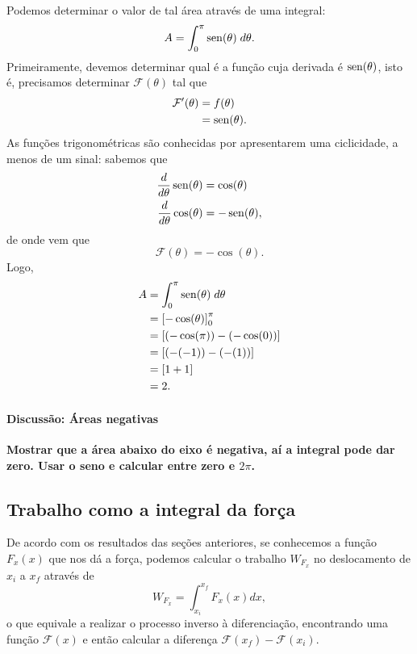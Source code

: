 Podemos determinar o valor de tal área através de uma integral:
\begin{equation}
    A = \int_0^{\pi} \operatorname{sen}(\theta) \; d\theta.
\end{equation}
%
Primeiramente, devemos determinar qual é a função cuja derivada é $\operatorname{sen}(\theta)$, isto é, precisamos determinar $\mathcal{F}(\theta)$ tal que
\begin{align}
    \mathcal{F}'(\theta) &= f(\theta) \\ 
    &= \operatorname{sen}(\theta).
\end{align}
%
As funções trigonométricas são conhecidas por apresentarem uma ciclicidade, a menos de um sinal: sabemos que
\begin{align}
    \frac{d}{d\theta} \operatorname{sen}(\theta) &= \cos(\theta) \\
    \frac{d}{d\theta} \cos(\theta) &= -\operatorname{sen}(\theta),
\end{align}
%
de onde vem que
\begin{equation}
    \mathcal{F}(\theta) = -\cos(\theta).
\end{equation}
%
Logo,
\begin{align}
    A &= \int_0^{\pi} \operatorname{sen}(\theta) \; d\theta \\
    &= \left[-\cos(\theta)\right]_{0}^{\pi} \\
    &= \left[(-\cos(\pi)) - (-\cos(0))\right] \\
    &= [(-(-1)) - (-(1))] \\
    &= [1 + 1] \\
    &= 2.
\end{align}

\paragraph{Discussão: Áreas negativas}

\textbf{Mostrar que a área abaixo do eixo é negativa, aí a integral pode dar zero. Usar o seno e calcular entre zero e $2\pi$.}

\subsection{Trabalho como a integral da força}

De acordo com os resultados das seções anteriores, se conhecemos a função $F_x(x)$ que nos dá a força, podemos calcular o trabalho $W_{F_x}$ no deslocamento de $x_i$ a $x_f$ através de
\begin{equation}\label{Eq:TrabalhoIntegral}
    W_{F_x} = \int_{x_i}^{x_f} F_x(x) dx,
\end{equation}
%
o que equivale a realizar o processo inverso à diferenciação, encontrando uma função $\mathcal{F}(x)$ e então calcular a diferença $\mathcal{F}(x_f) - \mathcal{F}(x_i)$. 


